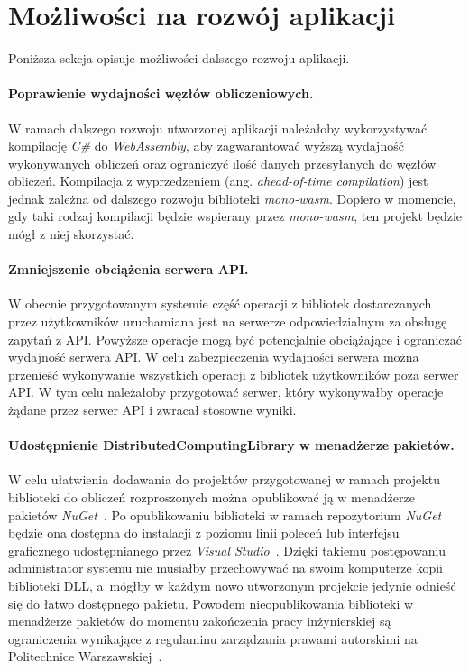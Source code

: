\documentclass[a4paper,11pt,twoside]{report}
\theoremstyle{definition}
\begin{document}
    \section{Możliwości na rozwój aplikacji}
        \label{mozliwosci-na-rozwoj-aplikacji}
        Poniższa sekcja opisuje możliwości dalszego rozwoju aplikacji.
    
        \paragraph{Poprawienie wydajności węzłów obliczeniowych.}
        W ramach dalszego rozwoju utworzonej aplikacji należałoby wykorzystywać kompilację \textit{C\#} do \textit{WebAssembly}, aby zagwarantować wyższą wydajność wykonywanych obliczeń oraz ograniczyć ilość danych przesyłanych do węzłów obliczeń. Kompilacja z wyprzedzeniem (ang. \textit{ahead-of-time compilation}) jest jednak zależna od dalszego rozwoju biblioteki \textit{mono-wasm}. Dopiero w momencie, gdy taki rodzaj kompilacji będzie wspierany przez \textit{mono-wasm}, ten projekt będzie mógł z niej skorzystać.
        
        \paragraph{Zmniejszenie obciążenia serwera API.}
        W obecnie przygotowanym systemie część operacji z bibliotek dostarczanych przez użytkowników uruchamiana jest na serwerze odpowiedzialnym za obsługę zapytań z API. Powyższe operacje mogą być potencjalnie obciążające i ograniczać wydajność serwera API. W celu zabezpieczenia wydajności serwera można przenieść wykonywanie wszystkich operacji z bibliotek użytkowników poza serwer API. W tym celu należałoby przygotować serwer, który wykonywałby operacje żądane przez serwer API i zwracał stosowne wyniki.
        
        \paragraph{Udostępnienie DistributedComputingLibrary w menadżerze pakietów.}
        W celu ułatwienia dodawania do projektów przygotowanej w ramach projektu biblioteki do obliczeń rozproszonych można opublikować ją w menadżerze pakietów \textit{NuGet}~\cite{nuget}. Po opublikowaniu biblioteki w ramach repozytorium \textit{NuGet} będzie ona dostępna do instalacji z poziomu linii poleceń lub interfejsu graficznego udostępnianego przez \textit{Visual Studio}~\cite{visual-studio}.
        Dzięki takiemu postępowaniu administrator systemu nie musiałby przechowywać na swoim komputerze kopii biblioteki DLL, a~mógłby w każdym nowo utworzonym projekcie jedynie odnieść się do łatwo dostępnego pakietu.
        Powodem nieopublikowania biblioteki w menadżerze pakietów do momentu zakończenia pracy inżynierskiej są ograniczenia wynikające z regulaminu zarządzania prawami autorskimi na Politechnice Warszawskiej~\cite{uchwala-prawa-autorskie}.
        
\end{document}
